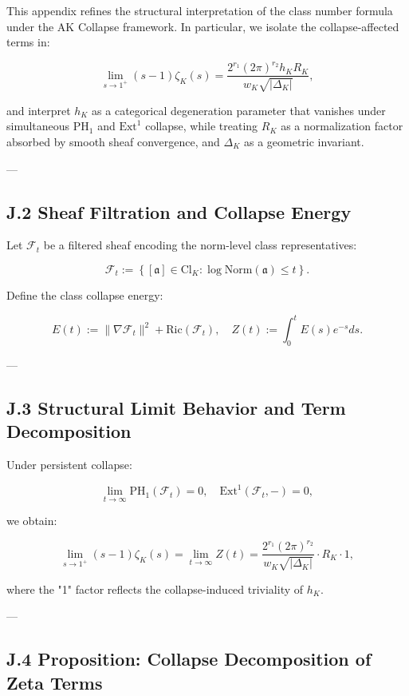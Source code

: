\documentclass[11pt]{article}
\begin{document}
This appendix refines the structural interpretation of the class number formula under the AK Collapse framework. In particular, we isolate the collapse-affected terms in:

\[
\lim_{s \to 1^+} (s - 1)\zeta_K(s) = \frac{2^{r_1}(2\pi)^{r_2} h_K R_K}{w_K \sqrt{|\Delta_K|}},
\]

and interpret $h_K$ as a categorical degeneration parameter that vanishes under simultaneous $\mathrm{PH}_1$ and $\mathrm{Ext}^1$ collapse, while treating $R_K$ as a normalization factor absorbed by smooth sheaf convergence, and $\Delta_K$ as a geometric invariant.

---

\subsection*{J.2 Sheaf Filtration and Collapse Energy}

Let $\mathcal{F}_t$ be a filtered sheaf encoding the norm-level class representatives:

\[
\mathcal{F}_t := \left\{ [\mathfrak{a}] \in \mathrm{Cl}_K : \log \mathrm{Norm}(\mathfrak{a}) \leq t \right\}.
\]

Define the class collapse energy:

\[
E(t) := \|\nabla \mathcal{F}_t\|^2 + \mathrm{Ric}(\mathcal{F}_t),
\quad
Z(t) := \int_0^t E(s)e^{-s} ds.
\]

---

\subsection*{J.3 Structural Limit Behavior and Term Decomposition}

Under persistent collapse:

\[
\lim_{t \to \infty} \mathrm{PH}_1(\mathcal{F}_t) = 0, \quad \mathrm{Ext}^1(\mathcal{F}_t, -) = 0,
\]

we obtain:

\[
\lim_{s \to 1^+} (s - 1) \zeta_K(s) = \lim_{t \to \infty} Z(t) = \frac{2^{r_1}(2\pi)^{r_2}}{w_K \sqrt{|\Delta_K|}} \cdot R_K \cdot 1,
\]

where the "1" factor reflects the collapse-induced triviality of $h_K$.

---

\subsection*{J.4 Proposition: Collapse Decomposition of Zeta Terms}
\end{document}
